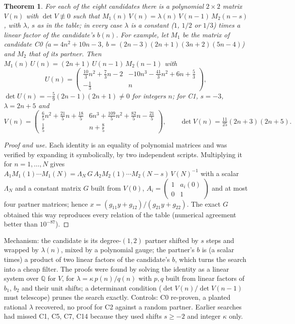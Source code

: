 \documentclass[11pt]{article}
\newtheorem{theorem}{Theorem}
\begin{document}
\begin{theorem}
For each of the eight candidates there is a polynomial $2\times2$ matrix $V(n)$ with $\det V\not\equiv0$ such that
$M_1(n)\,V(n)=\lambda(n)\,V(n-1)\,M_2(n-s)$, with $\lambda$, $s$ as in the table; in every case $\lambda$ is a constant ($1$, $1/2$ or
$1/3$) times a linear factor of the candidate's $b(n)$. For example, let $M_1$ be the matrix of candidate C0 ($a=4n^2+10n-3$, $b=(2n-3)(2n+1)(3n+2)(5n-4)$) and $M_2$ that of its partner. Then
$M_1(n)\,U(n)=(2n+1)\,U(n-1)\,M_2(n-1)$ with
\[U(n)=\begin{pmatrix}\frac{10}{3}n^2+\frac73n-2 & -10n^3-\frac{41}{3}n^2+6n+\frac53\\[2pt] -\frac13 & n\end{pmatrix},\]
$\det U(n)=-\frac59(2n-1)(2n+1)\neq0$ for integers $n$; for C1, $s=-3$, $\lambda=2n+5$ and
\[V(n)=\begin{pmatrix}\frac65n^2+\frac{21}5n+\frac{18}5 & 6n^3+\frac{109}5n^2+\frac{82}5n-\frac{21}5\\[2pt] \frac15 & n+\frac85\end{pmatrix},\qquad
\det V(n)=\tfrac{11}{25}(2n+3)(2n+5).\]
\end{theorem}
\begin{proof}[Proof and use]
Each identity is an equality of polynomial matrices and was verified by expanding it symbolically, by two independent scripts.
Multiplying it for $n=1,\dots,N$ gives $A_1M_1(1)\cdots M_1(N)=\Lambda_N\,G\,A_2M_2(1)\cdots M_2(N-s)\,V(N)^{-1}$ with a scalar
$\Lambda_N$ and a constant matrix $G$ built from $V(0)$, $A_i=\left(\begin{smallmatrix}1&a_i(0)\\0&1\end{smallmatrix}\right)$ and at
most four partner matrices; hence $x=(g_{11}y+g_{12})/(g_{21}y+g_{22})$. The exact $G$ obtained this way reproduces every relation
of the table (numerical agreement better than $10^{-87}$).
\end{proof}
Mechanism: the candidate is its degree-$(1,2)$ partner shifted by $s$ steps and wrapped by $\lambda(n)$, mixed by a polynomial
gauge; the partner's $b$ is (a scalar times) a product of two linear factors of the candidate's $b$, which turns the search into a
cheap filter. The proofs were found by solving the identity as a linear system over $\mathbb Q$ for $V$, for $\lambda=\kappa\,p(n)/q(n)$
with $p,q$ built from linear factors of $b_1$, $b_2$ and their unit shifts; a determinant condition ($\det V(n)/\det V(n-1)$ must
telescope) prunes the search exactly. Controls: C0 re-proven, a planted rational $\lambda$ recovered, no proof for C2 against a
random partner. Earlier searches had missed C1, C5, C7, C14 because they used shifts $s\ge-2$ and integer $\kappa$ only.
\end{document}
